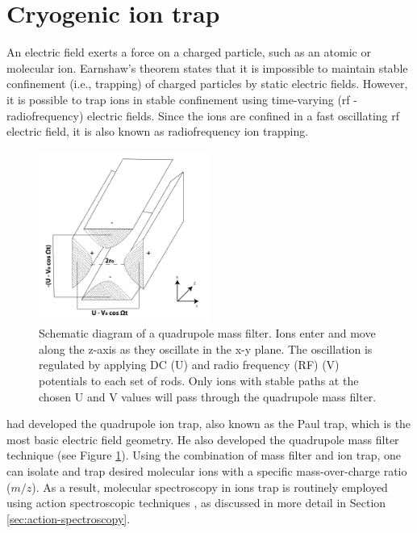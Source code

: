 \section{Cryogenic ion trap}

An electric field exerts a force on a charged particle, such as an atomic or molecular ion. Earnshaw's theorem states that it is impossible to maintain stable confinement (i.e., trapping) of charged particles by static electric fields. However, it is possible to trap ions in stable confinement using time-varying (rf - radiofrequency) electric fields. 
Since the ions are confined in a fast oscillating rf electric field, it is also known as radiofrequency ion trapping.

\begin{figure}[!htb]
    \centering
    \includegraphics[width=0.5\textwidth]{figures/intro/trap/Quadrupole.png}
    \caption{Schematic diagram of a quadrupole mass filter. Ions enter and move along the z-axis as they oscillate in the x-y plane. The oscillation is regulated by applying DC (U) and radio frequency (RF) (V) potentials to each set of rods. Only ions with stable paths at the chosen U and V values will pass through the quadrupole mass filter.}
    \label{fig:quadrupole}
\end{figure}

\citet{paul_ionenka_1955} had developed the quadrupole ion trap, also known as the Paul trap, which is the most basic electric field geometry. He also developed the quadrupole mass filter technique \cite{paul_elektrische_1955} (see Figure \ref{fig:quadrupole}). Using the combination of mass filter and ion trap, one can isolate and trap desired molecular ions with a specific mass-over-charge ratio ($m/z$). As a result, molecular spectroscopy in ions trap is routinely employed using action spectroscopic techniques \cite{SA2019, Roithovareview, Asvany2021}, as discussed in more detail in Section \ref{sec:action-spectroscopy}.

